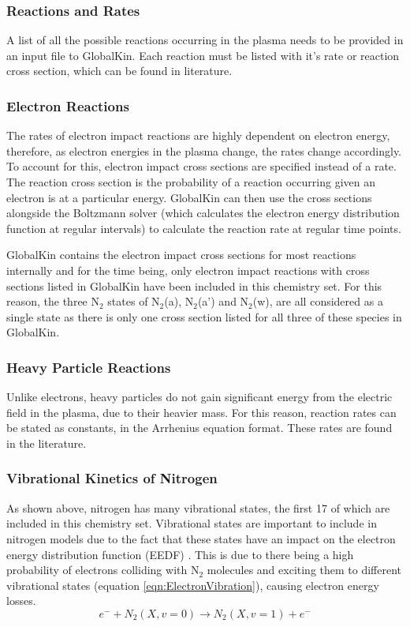 \documentclass[11pt, oneside]{article}   	%
\begin{document}
\subsubsection{Reactions and Rates}

A list of all the possible reactions occurring in the plasma needs to be provided in an input file to GlobalKin.
Each reaction must be listed with it's rate or reaction cross section, which can be found in literature.

\subsubsection*{Electron Reactions}
The rates of electron impact reactions are highly dependent on electron energy, therefore, as electron energies in the plasma change, the rates change accordingly.
To account for this, electron impact cross sections are specified instead of a rate.
The reaction cross section is the probability of a reaction occurring given an electron is at a particular energy.
GlobalKin can then use the cross sections alongside the Boltzmann solver (which calculates the electron energy distribution function at regular intervals) to calculate the reaction rate at regular time points.

GlobalKin contains the electron impact cross sections for most reactions internally and for the time being, only electron impact reactions with cross sections listed in GlobalKin have been included in this chemistry set.
For this reason, the three N$_2$ states of N$_2$(a), N$_2$(a') and N$_2$(w), are all considered as a single state as there is only one cross section listed for all three of these species in GlobalKin.

\subsubsection*{Heavy Particle Reactions}
Unlike electrons, heavy particles do not gain significant energy from the electric field in the plasma, due to their heavier mass.
For this reason, reaction rates can be stated as constants, in the Arrhenius equation format.
These rates are found in the literature.


\subsubsection*{Vibrational Kinetics of Nitrogen}

As shown above, nitrogen has many vibrational states, the first 17 of which are included in this chemistry set.
Vibrational states are important to include in nitrogen models due to the fact that these states have an impact on the electron energy distribution function (EEDF) \cite{Guerra2004kinetic}.
This is due to there being a high probability of electrons colliding with N$_2$ molecules and exciting them to different vibrational states (equation \ref{eqn:ElectronVibration}), causing electron energy losses.
\begin{equation}
e^- + N_2(X,v=0) \rightarrow N_2(X,v=1) + e^-
\label{eqn:ElectronVibration}
\end{equation}
\end{document}
